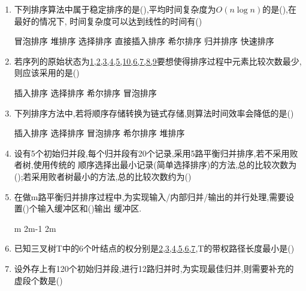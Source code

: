 \documentclass[12pt, a4paper, oneside, UTF8]{ctexbook}
\begin{document}
\begin{enumerate}
    \item 下列排序算法中属于稳定排序的是(),平均时间复杂度为$O(n\log{n})$的是(),在最好的情况下,
    时间复杂度可以达到线性的时间有() 
    \begin{choices}[4]
        \task 冒泡排序
        \task 堆排序
        \task 选择排序 
        \task 直接插入排序 
        \task 希尔排序 
        \task 归并排序 
        \task 快速排序
    \end{choices}

    \item 若序列的原始状态为\underline{1,2,3,4,5,10,6,7,8,9}要想使得排序过程中元素比较次数最少,则应该采用的是()
    \begin{choices}
        \task 插入排序 
        \task 选择排序 
        \task 希尔排序 
        \task 冒泡排序 
    \end{choices}
    
    \item \bl 下列排序方法中,若将顺序存储转换为链式存储,则算法时间效率会降低的是() 
    \begin{choices}[3]
        \task 插入排序 
        \task 选择排序
        \task 冒泡排序
        \task 希尔排序 
        \task 堆排序 
    \end{choices}
    
    \item 设有5个初始归并段,每个归并段有20个记录,采用5路平衡归并排序,若不采用败者树,使用传统的
    顺序选择出最小记录(简单选择排序)的方法,总的比较次数为();若采用败者树最小的方法,总的比较次数约为() 
    \begin{choices}
    \end{choices}


    \item 在做m路平衡归并排序过程中,为实现输入/内部归并/输出的并行处理,需要设置()个输入缓冲区和()输出
    缓冲区. 
    \begin{choices}
        \task m
        \task 2m-1
        \task 2m
    \end{choices}

    \item \bl 已知三叉树T中的6个叶结点的权分别是\underline{2,3,4,5,6,7},T的带权路径长度最小是() 
    \begin{choices}
    \end{choices}

    \item \bl 设外存上有120个初始归并段,进行12路归并时,为实现最佳归并,则需要补充的虚段个数是() 
    \begin{choices}
    \end{choices}
    



\end{enumerate}
\end{document}
